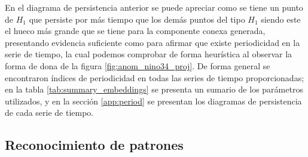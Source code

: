 \documentclass{article}
\begin{document}
            En el diagrama de persistencia anterior se puede apreciar como se tiene un punto de $H_1$ que persiste por más tiempo que los demás puntos del tipo $H_1$ siendo este el hueco más grande que se tiene para la componente conexa generada, presentando evidencia suficiente como para afirmar que existe periodicidad en la serie de tiempo, la cual podemos comprobar de forma heurística al observar la forma de dona de la figura \ref{fig:anom_nino34_proj}. De forma general se encontraron índices de periodicidad en todas las series de tiempo proporcionadas; en la tabla \ref{tab:summary_embeddings} se presenta un sumario de los parámetros utilizados, y en la sección \ref{app:period} se presentan los diagramas de persistencia de cada serie de tiempo.
            \begin{table}[!htbp]
                \centering
                \caption{Resumen de encajes de Takens y proyecciones}
                \label{tab:summary_embeddings}
            \end{table}

        \subsection{Reconocimiento de patrones}
\end{document}
